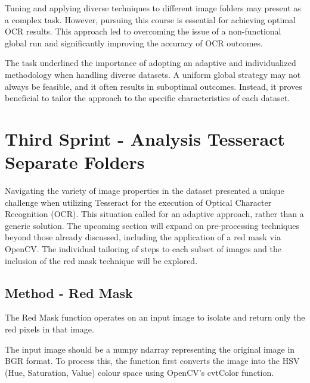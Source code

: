 Tuning and applying diverse techniques to different image folders may present as a complex task. However, pursuing this course is essential for achieving optimal OCR results. This approach led to overcoming the issue of a non-functional global run and significantly improving the accuracy of OCR outcomes.

The task underlined the importance of adopting an adaptive and individualized methodology when handling diverse datasets. A uniform global strategy may not always be feasible, and it often results in suboptimal outcomes. Instead, it proves beneficial to tailor the approach to the specific characteristics of each dataset.

\newpage

\section{Third Sprint - Analysis Tesseract Separate Folders}

Navigating the variety of image properties in the dataset presented a unique challenge when utilizing Tesseract for the execution of Optical Character Recognition (OCR). This situation called for an adaptive approach, rather than a generic solution. The upcoming section will expand on pre-processing techniques beyond those already discussed, including the application of a red mask via OpenCV. The individual tailoring of steps to each subset of images and the inclusion of the red mask technique will be explored.

\subsection*{Method - Red Mask}

The Red Mask function operates on an input image to isolate and return only the red pixels in that image.

The input image should be a numpy ndarray representing the original image in BGR format. To process this, the function first converts the image into the HSV (Hue, Saturation, Value) colour space using OpenCV's cvtColor function.

